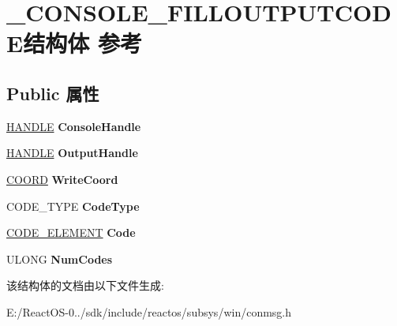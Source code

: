 \hypertarget{struct___c_o_n_s_o_l_e___f_i_l_l_o_u_t_p_u_t_c_o_d_e}{}\section{\+\_\+\+C\+O\+N\+S\+O\+L\+E\+\_\+\+F\+I\+L\+L\+O\+U\+T\+P\+U\+T\+C\+O\+D\+E结构体 参考}
\label{struct___c_o_n_s_o_l_e___f_i_l_l_o_u_t_p_u_t_c_o_d_e}
\subsection*{Public 属性}
\begin{DoxyCompactItemize}
\item 
\mbox{\label{struct___c_o_n_s_o_l_e___f_i_l_l_o_u_t_p_u_t_c_o_d_e_abb1f81629b42e9d539409e3a37a474c6}} 
\hyperlink{interfacevoid}{H\+A\+N\+D\+LE} {\bfseries Console\+Handle}
\item 
\mbox{\label{struct___c_o_n_s_o_l_e___f_i_l_l_o_u_t_p_u_t_c_o_d_e_a0edec3e6625078ee9eb092706fe5820a}} 
\hyperlink{interfacevoid}{H\+A\+N\+D\+LE} {\bfseries Output\+Handle}
\item 
\mbox{\label{struct___c_o_n_s_o_l_e___f_i_l_l_o_u_t_p_u_t_c_o_d_e_ac4214c21da9eb161c2dcdb28b76604ed}} 
\hyperlink{struct___c_o_o_r_d}{C\+O\+O\+RD} {\bfseries Write\+Coord}
\item 
\mbox{\label{struct___c_o_n_s_o_l_e___f_i_l_l_o_u_t_p_u_t_c_o_d_e_a3586a1afec4f7a3cf17d975cc75f1648}} 
C\+O\+D\+E\+\_\+\+T\+Y\+PE {\bfseries Code\+Type}
\item 
\mbox{\label{struct___c_o_n_s_o_l_e___f_i_l_l_o_u_t_p_u_t_c_o_d_e_a445159a7160fd9b339be0fe799edb7c2}} 
\hyperlink{union___c_o_d_e___e_l_e_m_e_n_t}{C\+O\+D\+E\+\_\+\+E\+L\+E\+M\+E\+NT} {\bfseries Code}
\item 
\mbox{\label{struct___c_o_n_s_o_l_e___f_i_l_l_o_u_t_p_u_t_c_o_d_e_ae063e810708f3466095b2a1904b66102}} 
U\+L\+O\+NG {\bfseries Num\+Codes}
\end{DoxyCompactItemize}


该结构体的文档由以下文件生成\+:\begin{DoxyCompactItemize}
\item 
E\+:/\+React\+O\+S-\/0../sdk/include/reactos/subsys/win/conmsg.\+h\end{DoxyCompactItemize}
